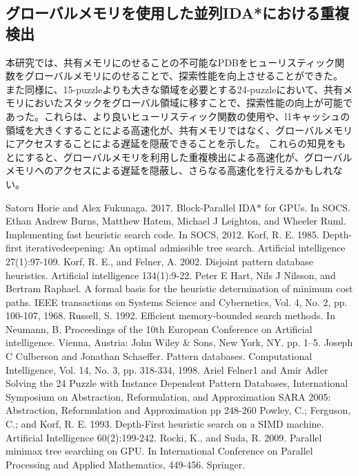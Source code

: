 \documentclass[a4paper,11pt,oneside,openany]{jsbook}
\begin{document}
\subsection{グローバルメモリを使用した並列IDA*における重複検出}
本研究では、共有メモリにのせることの不可能なPDBをヒューリスティック関数をグローバルメモリにのせることで、探索性能を向上させることができた。
また同様に、15-puzzleよりも大きな領域を必要とする24-puzzleにおいて、共有メモリにおいたスタックをグローバル領域に移すことで、探索性能の向上が可能であった。これらは、より良いヒューリスティック関数の使用や、l1キャッシュの領域を大きくすることによる高速化が、共有メモリではなく、グローバルメモリにアクセスすることによる遅延を隠蔽できることを示した。
これらの知見をもとにすると、グローバルメモリを利用した重複検出による高速化が、グローバルメモリへのアクセスによる遅延を隠蔽し、さらなる高速化を行えるかもしれない。


\begin{thebibliography}{10}
   Satoru Horie and Alex Fukunaga. 2017. Block-Parallel IDA* for GPUs. In SOCS.
  Ethan Andrew Burns, Matthew Hatem, Michael J Leighton, and Wheeler Ruml. Implementing fast heuristic search code. In SOCS, 2012.
  Korf, R. E. 1985. Depth-first iterativedeepening: An optimal admissible tree search. Artificial intelligence 27(1):97-109.
  Korf, R. E., and Felner, A. 2002. Disjoint pattern database heuristics. Artificial intelligence 134(1):9-22.
  Peter E Hart, Nils J Nilsson, and Bertram Raphael. A formal basis for the heuristic determination of minimum cost paths. IEEE transactions on Systems Science and Cybernetics, Vol. 4, No. 2, pp. 100-107, 1968. 
  Russell, S. 1992. Efficient memory-bounded search methods. In Neumann, B. Proceedings of the 10th European Conference on Artificial intelligence. Vienna, Austria: John Wiley \& Sons, New York, NY. pp. 1–5.
  Joseph C Culberson and Jonathan Schaeffer. Pattern databases. Computational Intelligence, Vol. 14, No. 3, pp. 318-334, 1998.
  Ariel Felner1 and Amir Adler Solving the 24 Puzzle with Instance Dependent Pattern Databases, International Symposium on Abstraction, Reformulation, and Approximation SARA 2005: Abstraction, Reformulation and Approximation pp 248-260
  \bibitem{Powley, Ferguson and Korf 1993]} Powley, C.; Ferguson, C.; and Korf, R. E. 1993. Depth-First heuristic search on a SIMD machine. Artificial Intelligence 60(2):199-242.
  Rocki, K., and Suda, R. 2009. Parallel minimax tree searching on GPU. In International Conference on Parallel Processing and Applied Mathematics, 449-456. Springer.



\end{thebibliography}
\end{document}
